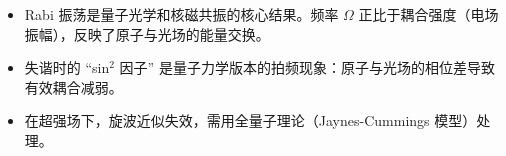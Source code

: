 \begin{insightbox}[物理图像]
\begin{itemize}
    \item Rabi 振荡是量子光学和核磁共振的核心结果。频率 $\Omega$ 正比于耦合强度（电场振幅），反映了原子与光场的能量交换。
    \item 失谐时的 ``sin$^2$ 因子'' 是量子力学版本的拍频现象：原子与光场的相位差导致有效耦合减弱。
    \item 在超强场下，旋波近似失效，需用全量子理论（Jaynes-Cummings 模型）处理。
\end{itemize}
\end{insightbox}
